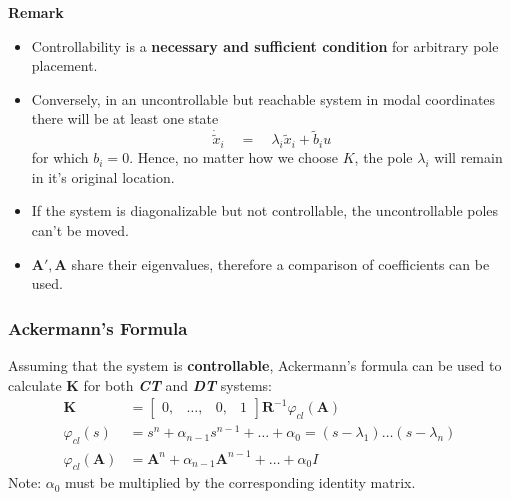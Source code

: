 \textbf{Remark}
\begin{itemize}
    \item Controllability is a \textbf{necessary and sufficient condition} for arbitrary pole placement.
    \item Conversely, in an uncontrollable but reachable system in modal coordinates there will be at least one state
          \begin{equation*}
              \dot{\tilde{x}}_i\quad=\quad\lambda_i\tilde{x}_i+\tilde{b}_iu
          \end{equation*}
          for which $b_i=0$. Hence, no matter how we choose $K$, the pole $\lambda_i$ will remain in it's original location.
    \item If the system is diagonalizable but not controllable, the uncontrollable poles can't be moved.
    \item $\mathbf{A'},\mathbf{A}$ share their eigenvalues, therefore a comparison of coefficients can be used.
\end{itemize}

\subsubsection{Ackermann's Formula}
Assuming that the system is \textbf{controllable}, Ackermann's formula can be used to calculate $\mathbf{K}$ for both \textbf{\textit{CT}} and \textbf{\textit{DT}} systems:
\noindent\begin{align*}
    \mathbf{K}               & =\begin{bmatrix}
                                    0, & \ldots, & 0, & 1
                                \end{bmatrix}
    \mathbf{R}^{-1}\varphi_{cl}(\mathbf{A})                                                              \\
    \varphi_{cl}(s)          & =s^n+\alpha_{n-1}s^{n-1}+\ldots+\alpha_0=(s-\lambda_1)\ldots(s-\lambda_n) \\
    \varphi_{cl}(\mathbf{A}) & =\mathbf{A}^n+\alpha_{n-1}\mathbf{A}^{n-1}+\ldots+\alpha_0 I
\end{align*}
Note: $\alpha_0$ must be multiplied by the corresponding identity matrix.


